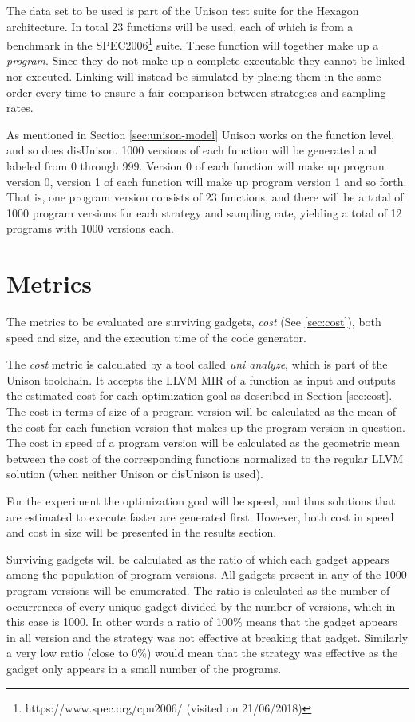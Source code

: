 The data set to be used is part of the Unison test suite for the Hexagon architecture. In
total 23 functions will be used, each of which is from a benchmark in the SPEC2006\footnote{https://www.spec.org/cpu2006/ (visited on 21/06/2018)}
suite. These function will together make up a \textit{program}. Since they do not make up
a complete executable they cannot be linked nor executed. Linking will instead be simulated
by placing them in the same order every time to ensure a fair comparison between
strategies and sampling rates.

As mentioned in Section \ref{sec:unison-model} Unison works on the function level, and so
does disUnison. 1000 versions of each function will be generated and labeled from 0 through
999. Version 0 of each function will make up program version 0, version 1 of each function
will make up program version 1 and so forth. That is, one program version consists of 23
functions, and there will be a total of 1000 program versions for each strategy and
sampling rate, yielding a total of 12 programs with 1000 versions each.

\section{Metrics}
\label{sec:metrics}

The metrics to be evaluated are surviving gadgets, \textit{cost} (See \ref{sec:cost}),
both speed and size, and the execution time of the code generator.

The \textit{cost} metric is calculated by a tool called \textit{uni analyze}, which is
part of the Unison toolchain. It accepts the LLVM MIR of a function as input and outputs
the estimated cost for each optimization goal as described in Section \ref{sec:cost}. The
cost in terms of size of a program version will be calculated as the mean of the cost for
each function version that makes up the program version in question. The cost in speed of
a program version will be calculated as the geometric mean between the cost of the corresponding
functions normalized to the regular LLVM solution (when neither Unison or disUnison is used).

For the experiment the optimization goal will be speed, and thus solutions that are
estimated to execute faster are generated first. However, both cost in speed and cost in
size will be presented in the results section.

Surviving gadgets will be calculated as the ratio of which each gadget appears among the
population of program versions. All gadgets present in any of the 1000 program versions
will be enumerated. The ratio is calculated as the number of occurrences of every unique
gadget divided by the number of versions, which in this case is 1000. In other words a
ratio of 100\% means that the gadget appears in all version and the strategy was not
effective at breaking that gadget. Similarly a very low ratio (close to 0\%) would mean
that the strategy was effective as the gadget only appears in a small number of the
programs.

